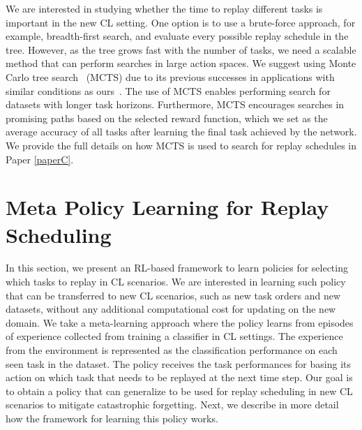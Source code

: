 We are interested in studying whether the time to replay different tasks is important in the new CL setting. One option is to use a brute-force approach, for example, breadth-first search, and evaluate every possible replay schedule in the tree. However, as the tree grows fast with the number of tasks, we need a scalable method that can perform searches in large action spaces. We suggest using Monte Carlo tree search~\cite{coulom2006efficient} (MCTS) due to its previous successes in applications with similar conditions as ours~\cite{browne2012survey, silver2016mastering, chaudhry2018feature}. The use of MCTS enables performing search for datasets with longer task horizons. Furthermore, MCTS encourages searches in promising paths based on the selected reward function, which we set as the average accuracy of all tasks after learning the final task achieved by the network. We provide the full details on how MCTS is used to search for replay schedules in Paper \ref{paperC}. 




\section{Meta Policy Learning for Replay Scheduling}
\label{sec:meta_policy_learning_for_replay_scheduling}

In this section, we present an RL-based framework to learn policies for selecting which tasks to replay in CL scenarios. We are interested in learning such policy that can be transferred to new CL scenarios, such as new task orders and new datasets, without any additional computational cost for updating on the new domain. We take a meta-learning approach where the policy learns from episodes of experience collected from training a classifier in CL settings. The experience from the environment is represented as the classification performance on each seen task in the dataset. The policy receives the task performances for basing its action on which task that needs to be replayed at the next time step. Our goal is to obtain a policy that can generalize to be used for replay scheduling in new CL scenarios to mitigate catastrophic forgetting. Next, we describe in more detail how the framework for learning this policy works.

